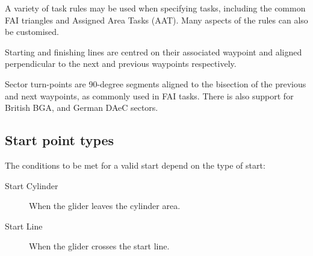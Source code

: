 A variety of task rules may be used when specifying tasks, including
the common FAI triangles and Assigned Area Tasks (AAT).  Many aspects
of the rules can also be customised.

Starting and finishing lines are centred on their associated waypoint
and aligned perpendicular to the next and previous waypoints
respectively.

Sector turn-points are 90-degree segments aligned to the bisection of
the previous and next waypoints, as commonly used in FAI tasks.
There is also support for British BGA, and German DAeC sectors.

\subsection*{Start point types}
The conditions to be met for a valid start depend on the type of start:
\begin{description}
\item[Start Cylinder] When the glider leaves the cylinder area.
\item[Start Line] When the glider crosses the start line.
\end{description}

